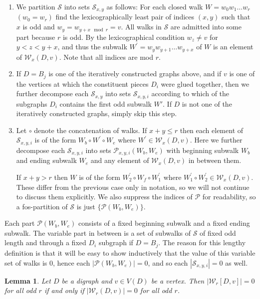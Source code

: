 \documentclass[11pt]{article}
\theoremstyle{plain}
\newtheorem{lemma}[theorem]{Lemma}
\newcommand{\W}[0]{\mathcal{W}}
\renewcommand{\P}[0]{\mathcal{P}}
\renewcommand{\S}[0]{\mathcal{S}}
\begin{document}
\begin{enumerate}
    \item We partition $\S$ into sets $\S_{x,y}$ as follows: For each closed walk $W=w_0w_1\dots w_{r}$ $(w_0=w_r)$ find the lexicographically least pair of indices $(x,y)$ such that $x$ is odd and $w_y=w_{y+x~\bmod{r}}=v$. All walks in $\S$ are admitted into some part because $r$ is odd. By the lexicographical condition $w_{z}\not=v$ for $y<z<y+x$, and thus the subwalk $W^\prime=w_yw_{y+1}\ldots w_{y+x}$ of $W$ is an element of $\W_x(D,v)$. Note that all indices are mod $r$.

    \item If $D=B_j$ is one of the iteratively constructed graphs above, and if $v$ is one of the vertices at which the constituent pieces $D_i$ were glued together, then we further decompose each $\S_{x,y}$ into sets $\S_{x,y,i}$ according to which of the subgraphs $D_i$ contains the first odd subwalk $W'$. If $D$ is not one of the iteratively constructed graphs, simply skip this step.

    \item Let $\circ$ denote the concatenation of walks. If $x+y\leq r$ then each element of $\S_{x,y,i}$ is of the form $W_b\circ W^\prime\circ W_e$ where $W^\prime\in \W_{x}(D,v)$. Here we further decompose each $\S_{x,y,i}$ into sets $\P_{x,y,i}(W_b,W_e)$ with beginning subwalk $W_b$ and ending subwalk $W_e$ and any element of $\W_{x}(D,v)$ in between them.
    
    If $x+y>r$ then $W$ is of the form $W_2^\prime\circ W_f\circ W_1^\prime$ where $W_1^\prime\circ W_2^\prime\in \W_x(D,v).$ These differ from the previous case only in notation, so we will not continue to discuss them explicitly. We also suppress the indices of $\P$ for readability, so a fos-partition of $\S$ is just $\{\P(W_b,W_e)\}.$
\end{enumerate}

Each part $\P(W_b,W_e)$ consists of a fixed beginning subwalk and a fixed ending subwalk. The variable part in between is a set of subwalks of $\S$ of fixed odd length and through a fixed $D_i$ subgraph if $D=B_j$. The reason for this lengthy definition is that it will be easy to show inductively that the value of this variable set of walks is $0$, hence each $|\P(W_b,W_e)|=0$, and so each $|\S_{x,y,i}|=0$ as well. 


\begin{lemma}\label{Lem:odd_walk_decomp}
Let $D$ be a digraph and $v\in V(D)$ be a vertex. Then $|\W_r[D,v]|=0$ for all odd $r$ if and only if $|\W_r(D,v)|=0$ for all odd $r$.   
\end{lemma}
\end{document}
